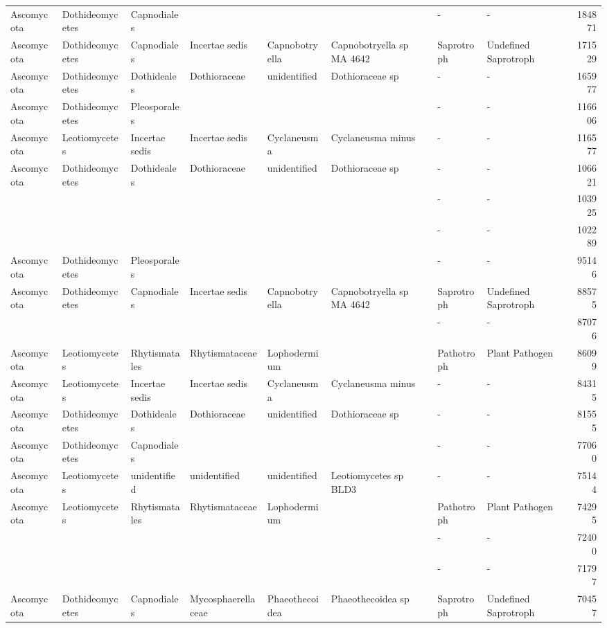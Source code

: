 \documentclass[12pt]{article}\usepackage[]{graphicx}\usepackage[]{color}
\numberwithin{figure}{section}
\begin{document}
\begin{landscape}
\begin{table}[ht]
\begin{tabular}{llllllllr}
  Ascomycota & Dothideomycetes & Capnodiales &  &  &  & - & - & 184871 \\ 
  Ascomycota & Dothideomycetes & Capnodiales & Incertae sedis & Capnobotryella & Capnobotryella sp MA 4642 & Saprotroph & Undefined Saprotroph & 171529 \\ 
  Ascomycota & Dothideomycetes & Dothideales & Dothioraceae & unidentified & Dothioraceae sp & - & - & 165977 \\ 
  Ascomycota & Dothideomycetes & Pleosporales &  &  &  & - & - & 116606 \\ 
  Ascomycota & Leotiomycetes & Incertae sedis & Incertae sedis & Cyclaneusma & Cyclaneusma minus & - & - & 116577 \\ 
  Ascomycota & Dothideomycetes & Dothideales & Dothioraceae & unidentified & Dothioraceae sp & - & - & 106621 \\ 
   &  &  &  &  &  & - & - & 103925 \\ 
   &  &  &  &  &  & - & - & 102289 \\ 
  Ascomycota & Dothideomycetes & Pleosporales &  &  &  & - & - & 95146 \\ 
  Ascomycota & Dothideomycetes & Capnodiales & Incertae sedis & Capnobotryella & Capnobotryella sp MA 4642 & Saprotroph & Undefined Saprotroph & 88575 \\ 
   &  &  &  &  &  & - & - & 87076 \\ 
  Ascomycota & Leotiomycetes & Rhytismatales & Rhytismataceae & Lophodermium &  & Pathotroph & Plant Pathogen & 86099 \\ 
  Ascomycota & Leotiomycetes & Incertae sedis & Incertae sedis & Cyclaneusma & Cyclaneusma minus & - & - & 84315 \\ 
  Ascomycota & Dothideomycetes & Dothideales & Dothioraceae & unidentified & Dothioraceae sp & - & - & 81555 \\ 
  Ascomycota & Dothideomycetes & Capnodiales &  &  &  & - & - & 77060 \\ 
  Ascomycota & Leotiomycetes & unidentified & unidentified & unidentified & Leotiomycetes sp BLD3 & - & - & 75144 \\ 
  Ascomycota & Leotiomycetes & Rhytismatales & Rhytismataceae & Lophodermium &  & Pathotroph & Plant Pathogen & 74295 \\ 
   &  &  &  &  &  & - & - & 72400 \\ 
   &  &  &  &  &  & - & - & 71797 \\ 
  Ascomycota & Dothideomycetes & Capnodiales & Mycosphaerellaceae & Phaeothecoidea & Phaeothecoidea sp & Saprotroph & Undefined Saprotroph & 70457 \\ 

\end{tabular}
\end{table}
\end{landscape}
\end{document}
